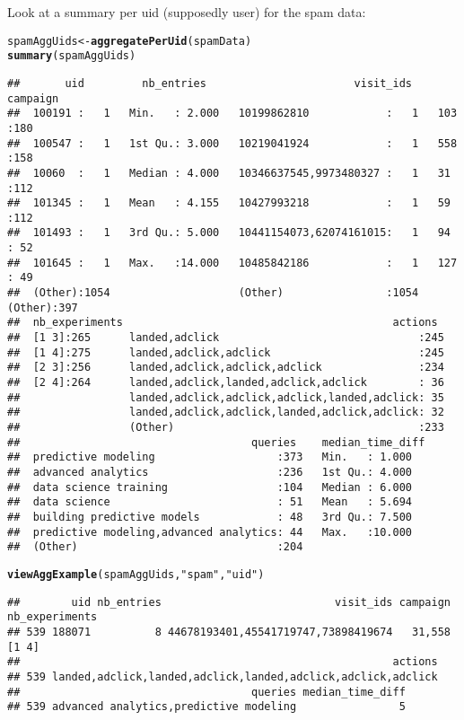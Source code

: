 \documentclass{article}\usepackage[]{graphicx}\usepackage[]{color}
\makeatletter
\newcommand{\hlstr}[1]{\textcolor[rgb]{0.192,0.494,0.8}{#1}}%
\newcommand{\hlstd}[1]{\textcolor[rgb]{0.345,0.345,0.345}{#1}}%
\newcommand{\hlkwb}[1]{\textcolor[rgb]{0.69,0.353,0.396}{#1}}%
\newcommand{\hlkwd}[1]{\textcolor[rgb]{0.737,0.353,0.396}{\textbf{#1}}}%
\newenvironment{kframe}{%
 \def\at@end@of@kframe{}%
 \ifinner\ifhmode%
  \def\at@end@of@kframe{\end{minipage}}%
  \begin{minipage}{\columnwidth}%
 \fi\fi%
 \def\FrameCommand##1{\hskip\@totalleftmargin \hskip-\fboxsep
 \colorbox{shadecolor}{##1}\hskip-\fboxsep
     \hskip-\linewidth \hskip-\@totalleftmargin \hskip\columnwidth}%
 \MakeFramed {\advance\hsize-\width
   \@totalleftmargin\z@ \linewidth\hsize
   \@setminipage}}%
 {\par\unskip\endMakeFramed%
 \at@end@of@kframe}
\newenvironment{knitrout}{}{} %
\makeatother
\begin{document}
Look at a summary per uid (supposedly user) for the spam data:
\begin{knitrout}
\color{fgcolor}\begin{kframe}
\begin{alltt}
\hlstd{spamAggUids} \hlkwb{<-} \hlkwd{aggregatePerUid}\hlstd{(spamData)}
\hlkwd{summary}\hlstd{(spamAggUids)}
\end{alltt}
\begin{verbatim}
##       uid         nb_entries                       visit_ids       campaign  
##  100191 :   1   Min.   : 2.000   10199862810            :   1   103    :180  
##  100547 :   1   1st Qu.: 3.000   10219041924            :   1   558    :158  
##  10060  :   1   Median : 4.000   10346637545,9973480327 :   1   31     :112  
##  101345 :   1   Mean   : 4.155   10427993218            :   1   59     :112  
##  101493 :   1   3rd Qu.: 5.000   10441154073,62074161015:   1   94     : 52  
##  101645 :   1   Max.   :14.000   10485842186            :   1   127    : 49  
##  (Other):1054                    (Other)                :1054   (Other):397  
##  nb_experiments                                          actions   
##  [1 3]:265      landed,adclick                               :245  
##  [1 4]:275      landed,adclick,adclick                       :245  
##  [2 3]:256      landed,adclick,adclick,adclick               :234  
##  [2 4]:264      landed,adclick,landed,adclick,adclick        : 36  
##                 landed,adclick,adclick,adclick,landed,adclick: 35  
##                 landed,adclick,adclick,landed,adclick,adclick: 32  
##                 (Other)                                      :233  
##                                    queries    median_time_diff
##  predictive modeling                   :373   Min.   : 1.000  
##  advanced analytics                    :236   1st Qu.: 4.000  
##  data science training                 :104   Median : 6.000  
##  data science                          : 51   Mean   : 5.694  
##  building predictive models            : 48   3rd Qu.: 7.500  
##  predictive modeling,advanced analytics: 44   Max.   :10.000  
##  (Other)                               :204
\end{verbatim}
\begin{alltt}
\hlkwd{viewAggExample}\hlstd{(spamAggUids,} \hlstr{"spam"}\hlstd{,} \hlstr{"uid"}\hlstd{)}
\end{alltt}
\begin{verbatim}
##        uid nb_entries                           visit_ids campaign nb_experiments
## 539 188071          8 44678193401,45541719747,73898419674   31,558          [1 4]
##                                                          actions
## 539 landed,adclick,landed,adclick,landed,adclick,adclick,adclick
##                                    queries median_time_diff
## 539 advanced analytics,predictive modeling                5
\end{verbatim}
\end{kframe}
\end{knitrout}
\end{document}
